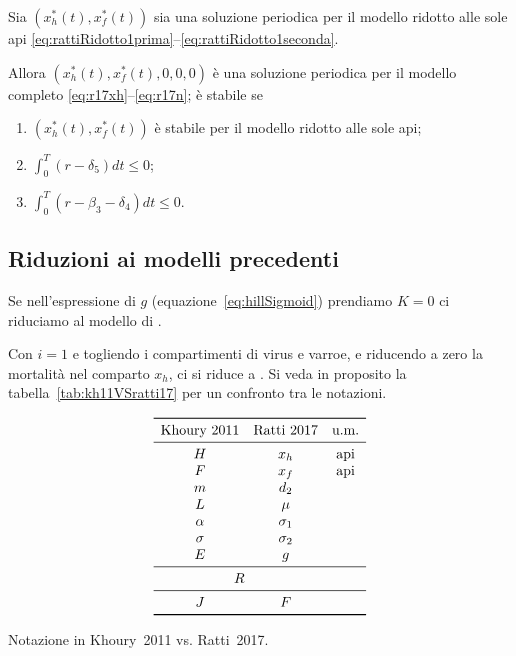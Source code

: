 \begin{proposizione}
    Sia $\left( x_h^*(t), x_f^*(t) \right)$ sia una soluzione periodica per il modello ridotto alle sole api \eqref{eq:rattiRidotto1prima}--\eqref{eq:rattiRidotto1seconda}.

    Allora $\left( x_h^*(t), x_f^*(t), 0, 0, 0 \right)$ è una soluzione periodica per il modello completo \eqref{eq:r17xh}--\eqref{eq:r17n}; è stabile se
    \begin{enumerate}
        \item $\left( x_h^*(t), x_f^*(t) \right)$ è stabile per il modello ridotto alle sole api;
        \item $\int_0^T (r - \delta_5) dt \leq 0$;
        \item $\int_0^T (r -\beta_3 - \delta_4) dt \leq 0$.
    \end{enumerate}
\end{proposizione}



\subsection{Riduzioni ai modelli precedenti}

Se nell'espressione di $g$ (equazione~\eqref{eq:hillSigmoid}) prendiamo $K=0$ ci riduciamo al modello di \cite{sumMar04}.

Con $i=1$ e togliendo i compartimenti di virus e varroe, e riducendo a zero la mortalità nel
comparto $x_h$, ci si riduce a \cite{khoury2011}. Si veda in proposito la tabella~\ref{tab:kh11VSratti17} per
un confronto tra le notazioni.

\begin{table}[pbh]
    $$\begin{array}{ccc}
        \toprule
        \text{Khoury~2011}
        & \text{Ratti~2017}
        & \text{u.m.} \\
        \midrule
        H & x_h & \text{api} \\
        F & x_f & \text{api} \\
        m & d_2 & \\ %
        L & \mu & \\
        \alpha & \sigma_1 & \\
        \sigma & \sigma_2 & \\
        E & g & \\
        \midrule
        \multicolumn{2}{c}{R} & \\
        \midrule
        J & F & \\
        \bottomrule
    \end{array}$$
    \caption{Notazione in Khoury~2011 vs. Ratti~2017.}
    \label{tab:kh11VSratti17}
\end{table}

